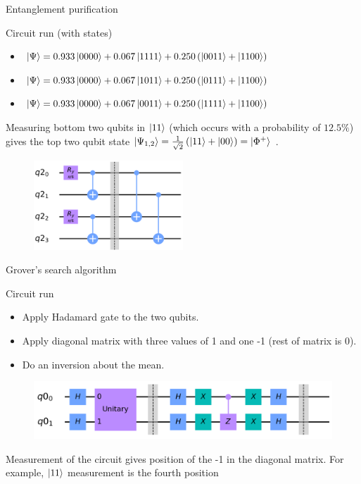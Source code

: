 \begin{frame}{Entanglement purification}
	
\begin{block}{Circuit run (with states)}
  \begin{itemize}
    \item $\ket{\Psi} = 0.933\ket{0000}+0.067\ket{1111}
    +0.250\left(\ket{0011}+\ket{1100}\right)$
    \item $\ket{\Psi} = 0.933\ket{0000}+0.067\ket{1011}
    +0.250\left(\ket{0111}+\ket{1100}\right)$
    \item $\ket{\Psi} =
    0.933\ket{0000}+0.067\ket{0011} +0.250\left(\ket{1111}+\ket{1100}\right)$
  \end{itemize}
\end{block}

Measuring bottom two qubits in $\ket{11}$ (which occurs with a probability of
$12.5\%$) gives the top two qubit state $\ket{\Psi_{1,2}} =
\frac{1}{\sqrt{2}}\left(\ket{11} +\ket{00}\right) = \ket{\Phi^+}$ .
	
\begin{figure}[h] \centering
  \includegraphics[width=0.5\textwidth]{images/purification_circuit.png}
  \label{fig:puri_circ}
\end{figure}
	
\end{frame}

\begin{frame}{Grover's search algorithm}
		
\begin{block}{Circuit run}
  \begin{itemize}
    \item Apply Hadamard gate to the two qubits.
    \item Apply diagonal matrix with three values of 1 and one -1 (rest of matrix is 0).
    \item Do an inversion about the mean.
  \end{itemize}
\end{block}


\begin{figure}[h] \centering
  \includegraphics[width=\textwidth]{images/grover_circuit.png}
  \label{fig:grov_circ}
\end{figure}
Measurement of the circuit gives position of the -1 in the diagonal matrix. For
example, $\ket{11}$ measurement is the fourth position
	
\end{frame}

